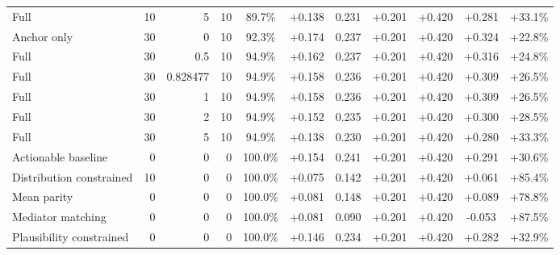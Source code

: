 \begin{table}[htbp]
\begin{tabular}{lrrrccccccc}
Full & 10 & 5 & 10 & 89.7\% & +0.138 & 0.231 & +0.201 & +0.420 & +0.281 & +33.1\% \\
Anchor only & 30 & 0 & 10 & 92.3\% & +0.174 & 0.237 & +0.201 & +0.420 & +0.324 & +22.8\% \\
Full & 30 & 0.5 & 10 & 94.9\% & +0.162 & 0.237 & +0.201 & +0.420 & +0.316 & +24.8\% \\
Full & 30 & 0.828477 & 10 & 94.9\% & +0.158 & 0.236 & +0.201 & +0.420 & +0.309 & +26.5\% \\
Full & 30 & 1 & 10 & 94.9\% & +0.158 & 0.236 & +0.201 & +0.420 & +0.309 & +26.5\% \\
Full & 30 & 2 & 10 & 94.9\% & +0.152 & 0.235 & +0.201 & +0.420 & +0.300 & +28.5\% \\
Full & 30 & 5 & 10 & 94.9\% & +0.138 & 0.230 & +0.201 & +0.420 & +0.280 & +33.3\% \\
Actionable baseline & 0 & 0 & 0 & 100.0\% & +0.154 & 0.241 & +0.201 & +0.420 & +0.291 & +30.6\% \\
Distribution constrained & 10 & 0 & 0 & 100.0\% & +0.075 & 0.142 & +0.201 & +0.420 & +0.061 & +85.4\% \\
Mean parity & 0 & 0 & 0 & 100.0\% & +0.081 & 0.148 & +0.201 & +0.420 & +0.089 & +78.8\% \\
Mediator matching & 0 & 0 & 0 & 100.0\% & +0.081 & 0.090 & +0.201 & +0.420 & -0.053 & +87.5\% \\
Plausibility constrained & 0 & 0 & 0 & 100.0\% & +0.146 & 0.234 & +0.201 & +0.420 & +0.282 & +32.9\% \\
\bottomrule
\end{tabular}
\end{table}